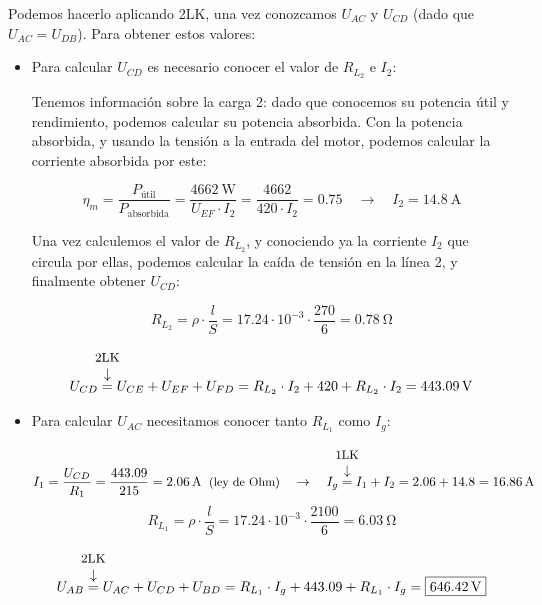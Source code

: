 \documentclass[10pt]{article}
\begin{document}
Podemos hacerlo aplicando 2LK, una vez conozcamos $U_{AC}$ y $U_{CD}$ (dado que $U_{AC} = U_{DB}$). Para obtener estos valores:
\begin{itemize}
    \item Para calcular $U_{CD}$ es necesario conocer el valor de $R_{L_2}$ e $I_2$:

    Tenemos información sobre la carga 2: dado que conocemos su potencia útil y rendimiento, podemos calcular su potencia absorbida. Con la potencia absorbida, y usando la tensión a la entrada del motor, podemos calcular la corriente absorbida por este:
    
    \[
        \eta_m = \frac{P_{\textrm{útil}}}{P_{\textrm{absorbida}}} = \frac{\qty{4662}{\watt}}{U_{EF} \cdot I_2} = \frac{4662}{420\cdot I_2} = 0.75 \quad \rightarrow \quad I_2 = \qty{14.8}{\ampere}
    \]

    Una vez calculemos el valor de $R_{L_2}$, y conociendo ya la corriente $I_2$ que circula por ellas, podemos calcular la caída de tensión en la línea 2, y finalmente obtener $U_{CD}$:

    \[
        R_{L_2} = \rho \cdot \frac{l}{S} = {17.24 \cdot 10^{-3}} \cdot \frac{270}{6} = \qty{0.78}{\ohm}
    \]
    
    \vspace{-10mm}
    \[
        U_{CD} \overarrow[=][\downarrow]{\small 2LK}  U_{CE} + U_{EF} + U_{FD} = R_{L_2}\cdot I_2 + 420 + R_{L_2}\cdot I_2 = \qty{443.09}{\volt}
    \]    

    \item Para calcular $U_{AC}$ necesitamos conocer tanto $R_{L_1}$ como $I_g$:

    \vspace{-7mm}
    \[
        I_1 = \frac{U_{CD}}{R_1} = \frac{443.09}{215} = \qty{2.06}{\ampere} \;\; \text{\small (ley de Ohm)} \quad \rightarrow \quad I_g \overarrow[=][\downarrow]{\small 1LK} I_1 + I_2 = 2.06 + 14.8 = \qty{16.86}{\ampere}
    \]
    \[
        R_{L_1} = \rho \cdot \frac{l}{S} = {17.24 \cdot 10^{-3}} \cdot \frac{2100}{6} = \qty{6.03}{\ohm}
    \]

    \vspace{-9mm}
    \[
        U_{AB} \overarrow[=][\downarrow]{\small 2LK}  U_{AC} + U_{CD} + U_{BD} = R_{L_1}\cdot I_g + 443.09 + R_{L_1}\cdot I_g = \boxed{ \qty{646.42}{\volt} }
    \]
    
\end{itemize}
\end{document}
